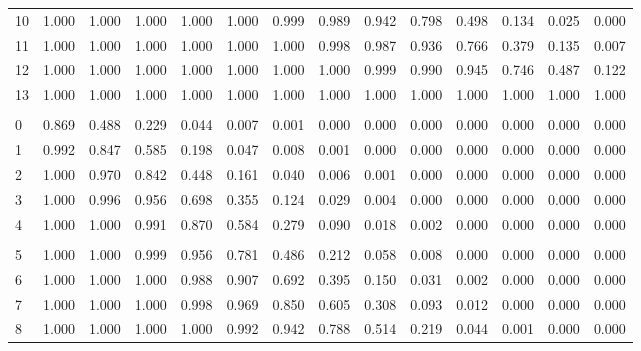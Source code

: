 \documentclass[
]{article}
\begin{document}
\begin{longtable}[t]{lrrrrrrrrrrrrr}
\hspace{1em}10 & 1.000 & 1.000 & 1.000 & 1.000 & 1.000 & 0.999 & 0.989 & 0.942 & 0.798 & 0.498 & 0.134 & 0.025 & 0.000\\
\hspace{1em}11 & 1.000 & 1.000 & 1.000 & 1.000 & 1.000 & 1.000 & 0.998 & 0.987 & 0.936 & 0.766 & 0.379 & 0.135 & 0.007\\
\hspace{1em}12 & 1.000 & 1.000 & 1.000 & 1.000 & 1.000 & 1.000 & 1.000 & 0.999 & 0.990 & 0.945 & 0.746 & 0.487 & 0.122\\
\hspace{1em}13 & 1.000 & 1.000 & 1.000 & 1.000 & 1.000 & 1.000 & 1.000 & 1.000 & 1.000 & 1.000 & 1.000 & 1.000 & 1.000\\
\addlinespace[0.3em]
\multicolumn{14}{l}{$n=14$}\\
\hspace{1em}0 & 0.869 & 0.488 & 0.229 & 0.044 & 0.007 & 0.001 & 0.000 & 0.000 & 0.000 & 0.000 & 0.000 & 0.000 & 0.000\\
\hspace{1em}1 & 0.992 & 0.847 & 0.585 & 0.198 & 0.047 & 0.008 & 0.001 & 0.000 & 0.000 & 0.000 & 0.000 & 0.000 & 0.000\\
\hspace{1em}2 & 1.000 & 0.970 & 0.842 & 0.448 & 0.161 & 0.040 & 0.006 & 0.001 & 0.000 & 0.000 & 0.000 & 0.000 & 0.000\\
\hspace{1em}3 & 1.000 & 0.996 & 0.956 & 0.698 & 0.355 & 0.124 & 0.029 & 0.004 & 0.000 & 0.000 & 0.000 & 0.000 & 0.000\\
\hspace{1em}4 & 1.000 & 1.000 & 0.991 & 0.870 & 0.584 & 0.279 & 0.090 & 0.018 & 0.002 & 0.000 & 0.000 & 0.000 & 0.000\\
\addlinespace[-.7em]
\multicolumn{14}{l}{ }\\
\hspace{1em}5 & 1.000 & 1.000 & 0.999 & 0.956 & 0.781 & 0.486 & 0.212 & 0.058 & 0.008 & 0.000 & 0.000 & 0.000 & 0.000\\
\hspace{1em}6 & 1.000 & 1.000 & 1.000 & 0.988 & 0.907 & 0.692 & 0.395 & 0.150 & 0.031 & 0.002 & 0.000 & 0.000 & 0.000\\
\hspace{1em}7 & 1.000 & 1.000 & 1.000 & 0.998 & 0.969 & 0.850 & 0.605 & 0.308 & 0.093 & 0.012 & 0.000 & 0.000 & 0.000\\
\hspace{1em}8 & 1.000 & 1.000 & 1.000 & 1.000 & 0.992 & 0.942 & 0.788 & 0.514 & 0.219 & 0.044 & 0.001 & 0.000 & 0.000\\

\end{longtable}
\end{document}

